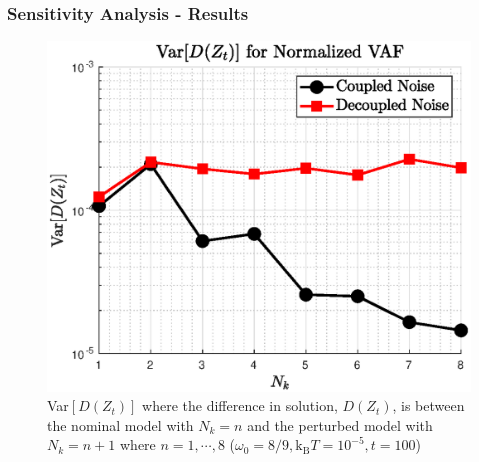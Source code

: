 \documentclass[a4paper,10pt]{beamer}
\newcommand{\sqb}[1]{\left[ #1 \right]}
\newcommand{\rb}[1]{\left( #1 \right)}
\begin{document}
	\begin{frame}
		\frametitle{Sensitivity Analysis - Results}
		\begin{figure}[H]
			\includegraphics[width=0.75\linewidth]{./Plots/sensitivityAnalysis/NkSensitivity.eps}
			\caption{Var$\sqb{D\rb{Z_{t}}}$ where the difference in solution, $D\rb{Z_{t}}$, is between the nominal model with $N_{k} = n$ and the perturbed model with $N_{k} = n+1$ where $n = 1, \cdots, 8$ ($\omega_{0} = 8/9,\text{k}_{\text{B}}T = 10^{-5},t=100$)}
		\end{figure}
	\end{frame}
\end{document}
